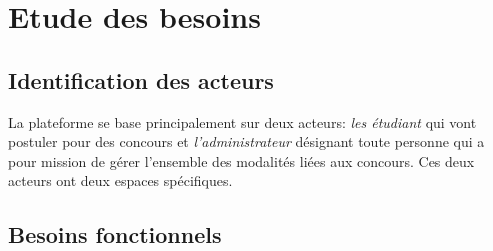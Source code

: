 \section{Etude des besoins}
\subsection{Identification des acteurs} 
\setlength{\parindent}{5ex}

La plateforme se base principalement sur deux acteurs: \emph{les étudiant} qui vont postuler pour des concours  et \emph{l'administrateur} désignant toute personne qui a pour mission de gérer l’ensemble des modalités liées aux concours. Ces deux acteurs ont deux espaces spécifiques.

\subsection{Besoins fonctionnels} 
